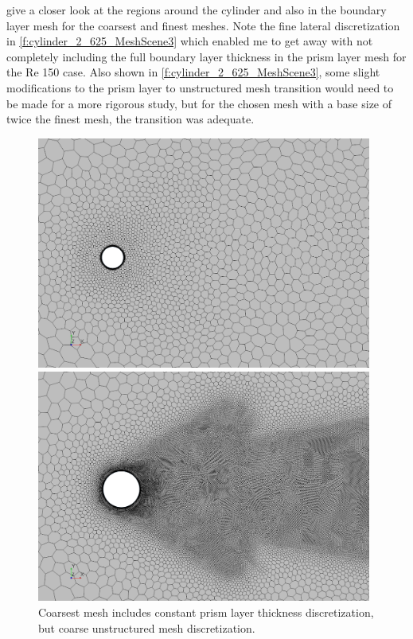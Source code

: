 \documentclass[10pt,english]{article}
\begin{document}
\newpage
{} give a closer look at the regions around the cylinder and also in the boundary layer mesh for the coarsest and finest meshes.  Note the fine lateral discretization in \cref{f:cylinder_2_625_MeshScene3} which enabled me to get away with not completely including the full boundary layer thickness in the prism layer mesh for the Re 150 case.  Also shown in \cref{f:cylinder_2_625_MeshScene3}, some slight modifications to the prism layer to unstructured mesh transition would need to be made for a more rigorous study, but for the chosen mesh with a base size of twice the finest mesh, the transition was adequate.  

\begin{figure}[h]
\centering
\begin{minipage}{.49\textwidth}
  \centering
\includegraphics[trim={6.0cm 6cm 13.4cm 6.2cm},clip,width=0.98\textwidth]{cylinder_2_1_MeshScene2_2.png}
\caption{Coarsest mesh includes constant prism layer thickness discretization, but coarse unstructured mesh discretization.}
\label{f:cylinder_2_1_MeshScene2_2}
\end{minipage}%
\hspace{5pt}
\begin{minipage}{.49\textwidth}
  \centering
\includegraphics[trim={2.0cm 0cm 2.9cm .5cm},clip,width=0.98\textwidth]{cylinder_2_625_MeshScene2_2.png}

\end{minipage}
\end{figure}
\end{document}
